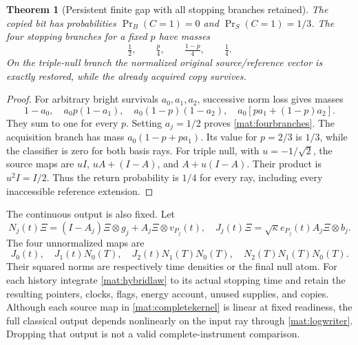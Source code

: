 \documentclass[11pt,oneside,openany]{book}
\newtheorem{theorem}{Theorem}[chapter]
\theoremstyle{definition}
\theoremstyle{remark}\newtheorem{remark}[theorem]{Remark}
\begin{document}
\begin{theorem}[Persistent finite gap with all stopping branches retained]
\label{mat:finitegap}
The copied bit has probabilities $\Pr_B(C=1)=0$ and $\Pr_S(C=1)=1/3$. The four stopping branches for a fixed $p$ have masses
\begin{equation}
 \tfrac12,\qquad\tfrac p4,\qquad\tfrac{1-p}4,\qquad\tfrac14.
 \label{mat:fourbranches}
\end{equation}
On the triple-null branch the normalized original source/reference vector is exactly restored, while the already acquired copy survives.
\end{theorem}
\begin{proof}
For arbitrary bright survivals $a_0,a_1,a_2$, successive norm loss gives masses
\[
 1-a_0,\quad a_0p(1-a_1),\quad a_0(1-p)(1-a_2),
 \quad a_0[pa_1+(1-p)a_2].
\]
They sum to one for every $p$. Setting $a_j=1/2$ proves \eqref{mat:fourbranches}. The acquisition branch has mass $a_0(1-p+pa_1)$. Its value for $p=2/3$ is $1/3$, while the classifier is zero for both basis rays. For triple null, with $u=-1/\sqrt2$, the source maps are $uI$, $uA+(I-A)$, and $A+u(I-A)$. Their product is $u^2I=I/2$. Thus the return probability is $1/4$ for every ray, including every inaccessible reference extension.
\end{proof}

The continuous output is also fixed. Let
\[
 N_j(t)\Xi=(I-A_j)\Xi\otimes g_j+A_j\Xi\otimes v_{P_j}(t),
 \quad J_j(t)\Xi=\sqrt\kappa e_{P_j}(t)A_j\Xi\otimes b_j.
\]
The four unnormalized maps are
\begin{equation}
 J_0(t),\quad J_1(t)N_0(T),\quad
 J_2(t)N_1(T)N_0(T),\quad N_2(T)N_1(T)N_0(T).
 \label{mat:completekernel}
\end{equation}
Their squared norms are respectively time densities or the final null atom. For each history integrate \eqref{mat:hybridlaw} to its actual stopping time and retain the resulting pointers, clocks, flags, energy account, unused supplies, and copies. Although each source map in \eqref{mat:completekernel} is linear at fixed readiness, the full classical output depends nonlinearly on the input ray through \eqref{mat:logwriter}. Dropping that output is not a valid complete-instrument comparison.
\end{document}

